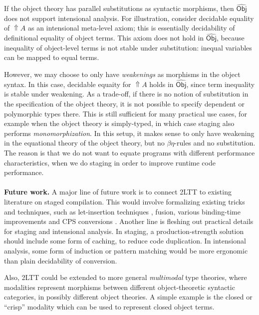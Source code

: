 \documentclass{easychair}
\newcommand{\msf}[1]{\mathsf{#1}}
\newcommand{\wh}[1]{\widehat{#1}}
\newcommand\whobj{\wh{\msf{Obj}}}
\newcommand{\Lift}{{\Uparrow}}
\theoremstyle{remark}
\begin{document}
If the object theory has parallel substitutions as syntactic morphisms,
then $\whobj$ does not support intensional analysis. For illustration, consider
decidable equality of $\Lift A$ as an intensional meta-level axiom; this is
essentially decidability of definitional equality of object terms. This
axiom does not hold in $\whobj$, because inequality of object-level terms
is not stable under substitution: inequal variables can be mapped to equal
terms.

However, we may choose to only have \emph{weakenings} as morphisms in the object
syntax. In this case, decidable equaity for $\Lift A$ holds in $\whobj$, since
term inequality is stable under weakening. As a trade-off, if there is no notion
of substitution in the specification of the object theory, it is not possible to
specify dependent or polymorphic types there. This is still sufficient for many
practical use cases, for example when the object theory is simply-typed, in
which case staging also performs \emph{monomorphization}. In this setup, it makes
sense to only have weakening in the equational theory of the object theory, but
no $\beta\eta$-rules and no substitution. The reason is that we do not want
to equate programs with different performance characteristics, when we do
staging in order to improve runtime code performance.
\\\\
\textbf{Future work.} A major line of future work is to connect 2LTT to existing
literature on staged compilation. This would involve formalizing existing tricks
and techniques, such as let-insertion techniques
\cite{DBLP:journals/corr/abs-2201-00495}, fusion, various binding-time
improvements and CPS conversions \cite{partial-evaluation}. Another line is
fleshing out practical details for staging and intensional analysis. In staging,
a production-strength solution should include some form of caching, to reduce
code duplication. In intensional analysis, some form of induction or pattern
matching would be more ergonomic than plain decidability of conversion.

Also, 2LTT could be extended to more general \emph{multimodal}
\cite{gratzer20multimodal} type theories, where modalities represent morphisms
between different object-theoretic syntactic categories, in possibly different
object theories. A simple example is the closed or ``crisp'' modality
\cite{licata2018internal} which can be used to represent closed object terms.




\end{document}
